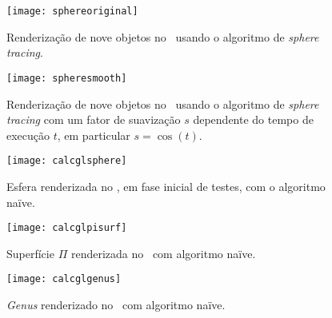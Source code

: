 \begin{figure}[!htbp]
	\centering
	\texttt{[image: sphereoriginal]}
	\caption[Nove objetos com \textit{sphere tracing} no \theapp]{Renderização de nove objetos no \theapp~usando o algoritmo de \textit{sphere tracing}.}
	\label{fig::sphereoriginal}
\end{figure}

\begin{figure}[!htbp]
	\centering
	\texttt{[image: spheresmooth]}
	\caption[Nove objetos com \textit{sphere tracing} e suavização no \theapp]{Renderização de nove objetos no \theapp~usando o algoritmo de \textit{sphere tracing} com um fator de suavização $s$ dependente do tempo de execução $t$, em particular $s = \cos(t)$.}
	\label{fig::spheresmooth}
\end{figure}

\begin{figure}[!htbp]
	\centering
	\texttt{[image: calcglsphere]}
	\caption[Esfera no \theapp~com algoritmo naïve]{Esfera renderizada no \theapp, em fase inicial de testes, com o algoritmo naïve.}
	\label{fig::calcglsphere}
\end{figure}

\begin{figure}[!htbp]
	\centering
	\texttt{[image: calcglpisurf]}
	\caption[Superfície $\Pi$ no \theapp~com algoritmo naïve]{Superfície $\Pi$ renderizada no \theapp~com algoritmo naïve.}
	\label{fig::calcglpisurf}
\end{figure}

\begin{figure}[!htbp]
	\centering
	\texttt{[image: calcglgenus]}
	\caption[\textit{Genus} no \theapp~com algoritmo naïve]{\textit{Genus} renderizado no \theapp~com algoritmo naïve.}
	\label{fig::calcglgenus}
\end{figure}



